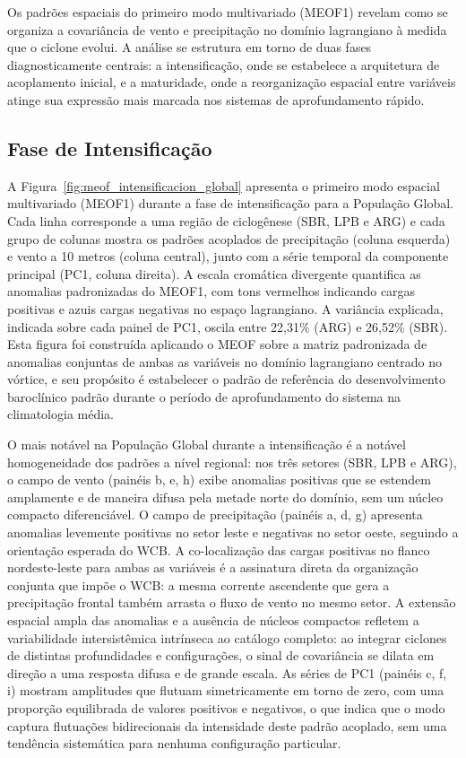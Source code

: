 Os padrões espaciais do primeiro modo multivariado (MEOF1) revelam como se organiza a covariância de vento e precipitação no domínio lagrangiano à medida que o ciclone evolui.
A análise se estrutura em torno de duas fases diagnosticamente centrais: a intensificação, onde se estabelece a arquitetura de acoplamento inicial, e a maturidade, onde a reorganização espacial entre variáveis atinge sua expressão mais marcada nos sistemas de aprofundamento rápido.

\subsection{Fase de Intensificação}
\label{subsec:meof_intensificacion}

A Figura~\ref{fig:meof_intensificacion_global} apresenta o primeiro modo espacial multivariado (MEOF1) durante a fase de intensificação para a População Global.
Cada linha corresponde a uma região de ciclogênese (SBR, LPB e ARG) e cada grupo de colunas mostra os padrões acoplados de precipitação (coluna esquerda) e vento a 10 metros (coluna central), junto com a série temporal da componente principal (PC1, coluna direita).
A escala cromática divergente quantifica as anomalias padronizadas do MEOF1, com tons vermelhos indicando cargas positivas e azuis cargas negativas no espaço lagrangiano. A variância explicada, indicada sobre cada painel de PC1, oscila entre 22,31\% (ARG) e 26,52\% (SBR).
Esta figura foi construída aplicando o MEOF sobre a matriz padronizada de anomalias conjuntas de ambas as variáveis no domínio lagrangiano centrado no vórtice, e seu propósito é estabelecer o padrão de referência do desenvolvimento baroclínico padrão durante o período de aprofundamento do sistema na climatologia média.

O mais notável na População Global durante a intensificação é a notável homogeneidade dos padrões a nível regional: nos três setores (SBR, LPB e ARG), o campo de vento (painéis b, e, h) exibe anomalias positivas que se estendem amplamente e de maneira difusa pela metade norte do domínio, sem um núcleo compacto diferenciável.
O campo de precipitação (painéis a, d, g) apresenta anomalias levemente positivas no setor leste e negativas no setor oeste, seguindo a orientação esperada do WCB. A co-localização das cargas positivas no flanco nordeste-leste para ambas as variáveis é a assinatura direta da organização conjunta que impõe o WCB: a mesma corrente ascendente que gera a precipitação frontal também arrasta o fluxo de vento no mesmo setor.
A extensão espacial ampla das anomalias e a ausência de núcleos compactos refletem a variabilidade intersistêmica intrínseca ao catálogo completo: ao integrar ciclones de distintas profundidades e configurações, o sinal de covariância se dilata em direção a uma resposta difusa e de grande escala.
As séries de PC1 (painéis c, f, i) mostram amplitudes que flutuam simetricamente em torno de zero, com uma proporção equilibrada de valores positivos e negativos, o que indica que o modo captura flutuações bidirecionais da intensidade deste padrão acoplado, sem uma tendência sistemática para nenhuma configuração particular.

